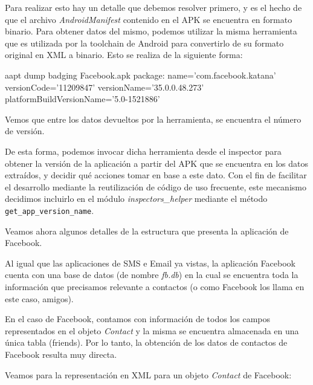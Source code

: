 Para realizar esto hay un detalle que debemos resolver primero, y es el hecho de que el archivo \emph{AndroidManifest} contenido en el APK se encuentra en formato binario. Para obtener datos del mismo, podemos utilizar la misma herramienta que es utilizada por la toolchain de Android para convertirlo de su formato original en XML a binario. Esto se realiza de la siguiente forma:
\newline

\begin{bash}
aapt dump badging Facebook.apk
package: name='com.facebook.katana' versionCode='11209847' versionName='35.0.0.48.273' platformBuildVersionName='5.0-1521886'
\end{bash}

Vemos que entre los datos devueltos por la herramienta, se encuentra el número de versión.

De esta forma, podemos invocar dicha herramienta desde el inspector para obtener la versión de la aplicación a partir del APK que se encuentra en los datos extraídos, y decidir qué acciones tomar en base a este dato. Con el fin de facilitar el desarrollo mediante la reutilización de código de uso frecuente, este mecanismo decidimos incluirlo en el módulo \emph{inspectors\_helper} mediante el método \texttt{get\_app\_version\_name}.

Veamos ahora algunos detalles de la estructura que presenta la aplicación de Facebook.

Al igual que las aplicaciones de SMS e Email ya vistas, la aplicación Facebook cuenta con una base de datos (de nombre \emph{fb.db}) en la cual se encuentra toda la información que precisamos relevante a contactos (o como Facebook los llama en este caso, amigos).

En el caso de Facebook, contamos con información de todos los campos representados en el objeto \emph{Contact} y la misma se encuentra almacenada en una única tabla (friends). Por lo tanto, la obtención de los datos de contactos de Facebook resulta muy directa.

Veamos para la representación en XML para un objeto \emph{Contact} de Facebook:
\newline

